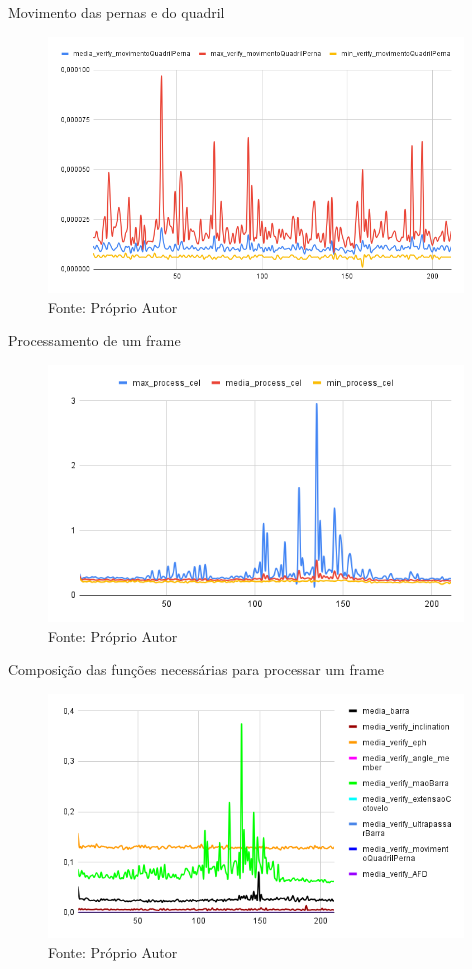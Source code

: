 \begin{frame}{Movimento das pernas e do quadril}
   \begin{figure}[H]
    \includegraphics[width=11cm]{img/resultados/movimentoQuadril.png}
    {Fonte: Próprio Autor}
    \label{figura:configs_server}
    \end{figure}
\end{frame}




\begin{frame}{Processamento de um frame}
   \begin{figure}[H]
    \includegraphics[width=11cm]{img/resultados/process_cell.png}
    {Fonte: Próprio Autor}
    \label{figura:configs_server}
    \end{figure}
\end{frame}


\begin{frame}{Composição das funções necessárias para processar um frame}
   \begin{figure}[H]
    \includegraphics[width=11cm]{img/resultados/comp_process_cell_2.png}
    {Fonte: Próprio Autor}
    \label{figura:configs_server}
    \end{figure}
\end{frame}


